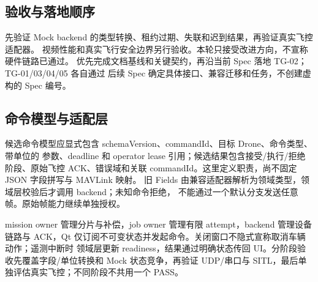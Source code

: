 \subsection{验收与落地顺序}
先验证 Mock backend 的类型转换、租约过期、失联和迟到结果，再验证真实飞控适配器。
视频性能和真实飞行安全边界另行验收。本轮只接受改进方向，不宣称硬件链路已通过。
优先完成文档基线和关键契约，再沿当前 Spec 落地 TG-02；TG-01/03/04/05 各自通过
后续 Spec 确定具体接口、兼容迁移和任务，不创建虚构的 Spec 编号。

\subsection{命令模型与适配层}
候选命令模型应显式包含 schemaVersion、commandId、目标 Drone、命令类型、带单位的
参数、deadline 和 operator lease 引用；候选结果包含接受/执行/拒绝阶段、原始飞控
ACK、错误域和关联 commandId。这里定义职责，尚不固定 JSON 字段拼写与 MAVLink 映射。
旧 Fields 由兼容适配器解析为领域类型，领域层校验后才调用 backend；未知命令拒绝，
不能通过一个默认分支发送任意帧。原始帧能力继续单独授权。

mission owner 管理分片与补偿，job owner 管理有限 attempt，backend 管理设备链路与
ACK，Qt 仅订阅不可变状态并发起命令。关闭窗口不隐式宣称取消车辆动作；遥测中断时
领域层更新 readiness，结果通过明确状态传回 UI。分阶段验收先覆盖字段/单位转换和
Mock 状态竞争，再验证 UDP/串口与 SITL，最后单独评估真实飞控；不同阶段不共用一个 PASS。
